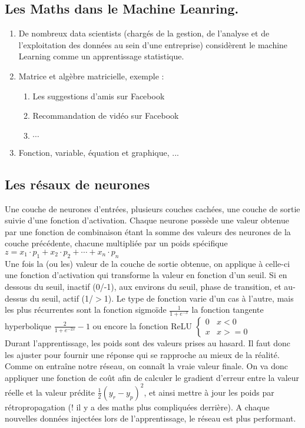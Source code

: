 \documentclass[a4paper, 12pt]{article}
\numberwithin{equation}{subsection}
\begin{document}
\subsection{Les Maths dans le Machine Leanring.}
\begin{enumerate}
  \item De nombreux data scientists (chargés de la gestion, de l’analyse et de l’exploitation des données au sein d’une entreprise) considèrent le machine Learning comme un apprentissage statistique.
  \item Matrice et algèbre matricielle, exemple :
        \begin{enumerate}
          \item Les suggestions d’amis sur Facebook
          \item Recommandation de vidéo sur Facebook
          \item $\cdots$
        \end{enumerate}
  \item Fonction, variable, équation et graphique, ...
\end{enumerate}

\subsection{Les résaux de neurones}
Une couche de neurones d’entrées, plusieurs couches cachées, une couche de sortie suivie d’une fonction d’activation.
Chaque neurone possède une valeur obtenue par une fonction de combinaison étant la somme des valeurs des neurones de la couche précédente, chacune multipliée par un poids spécifique
$ z = x_1 \cdot p_1 + x_2 \cdot p_2 + \cdots + x_n \cdot p_n $ \\
Une fois la (ou les) valeur de la couche de sortie obtenue, on applique à celle-ci une fonction d’activation qui transforme la valeur en fonction d’un seuil. Si en dessous du seuil, inactif (0/-1), aux environs du seuil, phase de transition, et au-dessus du seuil, actif (1/$>$1). Le type de fonction varie d’un cas à l’autre, mais les plus récurrentes sont la fonction sigmoïde $ \frac{1}{1 + e^{-x}}$ la fonction tangente hyperbolique $ \frac{2} {1 + e^{-2x}} -1 $
ou encore la fonction ReLU $\begin{cases} 0 & x < 0 \\ x & x >= 0 \end{cases}$ \\
Durant l’apprentissage, les poids sont des valeurs prises au hasard. Il faut donc les ajuster pour fournir une réponse qui se rapproche au mieux de la réalité. Comme on entraîne notre réseau, on connaît la vraie valeur finale. On va donc appliquer une fonction de coût afin de calculer le gradient d’erreur entre la valeur réelle et la valeur prédite $ \frac{1}{2}(y_r - y_p)^2 $, et ainsi mettre à jour les poids par rétropropagation (! il y a des maths plus compliquées derrière). A chaque nouvelles données injectées lors de l’apprentissage, le réseau est plus performant.
\end{document}

